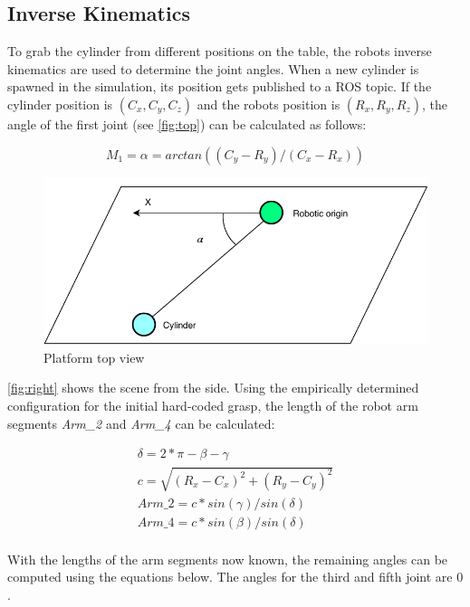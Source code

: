 \subsection{Inverse Kinematics}
To grab the cylinder from different positions on the table, the robots inverse kinematics are used to determine the joint angles.
When a new cylinder is spawned in the simulation, its position gets published to a ROS topic.
If the cylinder position is $(C_x, C_y, C_z)$ and the robots position is $(R_x, R_y, R_z)$, the angle of the first joint (see \autoref{fig:top}) can be calculated as follows:

\begin{equation}
\label{simple_equation}
M_1=\alpha = arctan((C_y-R_y)/(C_x-R_x))
\end{equation}

\begin{figure}[htpb]
\centering
	\includegraphics[width=0.96\linewidth]{figures/top_view.pdf} 
	\caption{Platform top view}
	\vspace{-0.4cm}
	\label{fig:top}
\end{figure}

\autoref{fig:right} shows the scene from the side.
Using the empirically determined configuration for the initial hard-coded grasp, the length of the robot arm segments \textit{Arm\_2} and \textit{Arm\_4} can be calculated:

\begin{equation}
\begin{aligned}
\delta=2*\pi-\beta-\gamma\\
c=\sqrt{(R_x-C_x)^2+(R_y-C_y)^2}\\
\textit{Arm\_2}=c*sin(\gamma)/sin(\delta)\\
\textit{Arm\_4}=c*sin(\beta)/sin(\delta)\\
\end{aligned}
\end{equation}

With the lengths of the arm segments now known, the remaining angles can be computed using the equations below.
The angles for the third and fifth joint are $0$.

